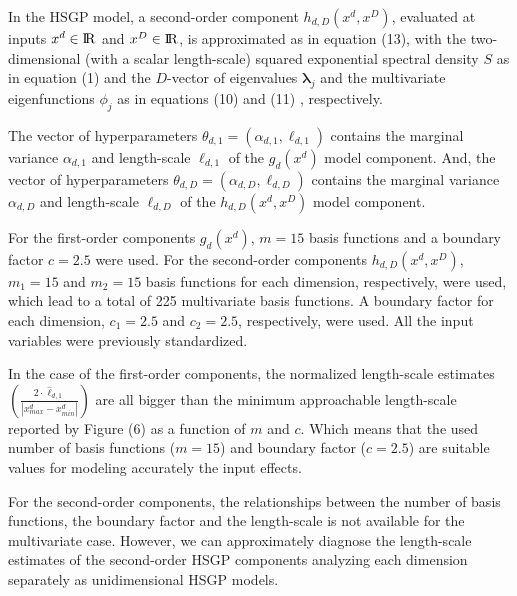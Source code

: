 \documentclass[onecolumn,a4paper,11pt]{article}
\begin{document}
\noindent In the HSGP model, a second-order component $h_{d,D}(x^d,x^D)$, evaluated at inputs $x^d \in {\rm I\!R}$ and $x^D \in {\rm I\!R}$, is approximated as in equation (13), %
 with the two-dimensional (with a scalar length-scale) squared exponential spectral density $S$ as in equation (1) %
 and the $D$-vector of eigenvalues $\bm{\lambda}_j$ and the multivariate eigenfunctions $\phi_j$ as in equations (10) %
 and (11)%
 , respectively. 

The vector of hyperparameters $\theta_{d,1}=(\alpha_{d,1},\ell_{d,1})$ contains the marginal variance $\alpha_{d,1}$ and length-scale $\ell_{d,1}$ of the $g_d(x^d)$ model component. And, the vector of hyperparameters $\theta_{d,D}=(\alpha_{d,D},\ell_{d,D})$ contains the marginal variance $\alpha_{d,D}$ and length-scale $\ell_{d,D}$ of the $h_{d,D}(x^d,x^D)$ model component.
 

For the first-order components $g_d(x^d)$, $m=15$ basis functions and a boundary factor $c=2.5$ were used. For the second-order components $h_{d,D}(x^d,x^D)$, $m_1=15$ and $m_2=15$ basis functions for each dimension, respectively, were used, which lead to a total of 225 multivariate basis functions. A boundary factor for each dimension, $c_1=2.5$ and $c_2=2.5$, respectively, were used. All the input variables were previously standardized.

In the case of the first-order components, the normalized length-scale estimates $\left(\frac{2\cdot \hat{\ell}_{d,1}}{|x^d_{max}-x^d_{min}|}\right)$ are all bigger than the minimum approachable length-scale reported by Figure (6) %
as a function of $m$ and $c$. Which means that the used number of basis functions ($m=15$) and boundary factor ($c=2.5$) are suitable values for modeling accurately the input effects.

For the second-order components, the relationships between the number of basis functions, the boundary factor and the length-scale is not available for the multivariate case. However, we can approximately diagnose the length-scale estimates of the second-order HSGP components analyzing each dimension separately as unidimensional HSGP models.
\end{document}
